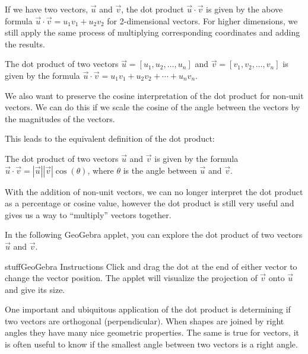 \documentclass{ximera}
\begin{document}
If we have two vectors, $\vec u$ and $\vec v$, the dot product $\vec u\cdot\vec v$ is given by the above formula $\vec u\cdot\vec v=u_1v_1+u_2v_2$ for 2-dimensional vectors. For higher dimensions, we still apply the same process of multiplying corresponding coordinates and adding the results.

\begin{definition}
The dot product of two vectors $\vec{u}=[u_1,u_2,\ldots,u_n]$ and $\vec{v}=[v_1,v_2,\ldots,v_n]$ is given by the formula $\vec{u}\cdot\vec{v}=u_1v_1+u_2v_2+\cdots+u_nv_n$.
\end{definition}

We also want to preserve the cosine interpretation of the dot product for non-unit vectors. We can do this if we scale the cosine of the angle between the vectors by the magnitudes of the vectors. 

This leads to the equivalent definition of the dot product:

\begin{definition}
The dot product of two vectors $\vec{u}$ and $\vec{v}$ is given by the formula $\vec{u}\cdot\vec{v}=|\vec{u}||\vec{v}|\cos(\theta)$, where $\theta$ is the angle between $\vec{u}$ and $\vec{v}$.
\end{definition}

With the addition of non-unit vectors, we can no longer interpret the dot product as a percentage or cosine value, however the dot product is still very useful and gives us a way to ``multiply'' vectors together.

In the following GeoGebra applet, you can explore the dot product of two vectors $\vec u$ and $\vec v$.

\begin{expandable}{stuff}{GeoGebra Instructions}
    Click and drag the dot at the end of either vector to change the vector position. The applet will visualize the projection of $\vec{v}$ onto $\vec{u}$ and give its size.
\end{expandable}

\begin{center}
\end{center}

One important and ubiquitous application of the dot product is determining if two vectors are orthogonal (perpendicular). When shapes are joined by right angles they have many nice geometric properties. The same is true for vectors, it is often useful to know if the smallest angle between two vectors is a right angle.
\end{document}
